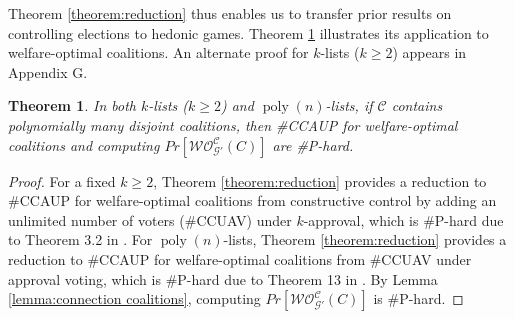 \documentclass[letterpaper]{article} %
\newtheorem{theorem}{Theorem}
\DeclareMathOperator*{\poly}{poly}
\begin{document}
Theorem \ref{theorem:reduction} thus enables us to transfer prior results on controlling elections to hedonic games. Theorem \ref{theorem:CCAUP-computationally-hard} illustrates its application to welfare-optimal coalitions. An alternate proof for $k$-lists ($k \geq 2$) appears in Appendix G. %
\begin{theorem}
\label{theorem:CCAUP-computationally-hard}
In both $k$-lists ($k \geq 2$) and $\poly(n)$-lists, if $\mathcal{C}$ contains polynomially many \textit{disjoint} coalitions, then \#CCAUP for welfare-optimal coalitions and computing $Pr[\mathcal{WO}^{\mathcal{C}}_{\mathcal{G}'}(C)]$ are \#P-hard. %
\end{theorem}
\begin{proof}
%
For a fixed $k \geq 2$, Theorem \ref{theorem:reduction} provides a reduction to \#CCAUP for welfare-optimal coalitions from constructive control by adding an unlimited number of voters (\#CCUAV) under $k$-approval, which is \#P-hard due to Theorem 3.2 in \cite{imber2021probabilistic}. For $\poly(n)$-lists, Theorem \ref{theorem:reduction} provides a reduction to \#CCAUP for welfare-optimal coalitions from \#CCUAV under approval voting, which is \#P-hard due to Theorem 13 in \cite{wojtas2012possible}. %
By Lemma \ref{lemma:connection coalitions}, computing $Pr[\mathcal{WO}^{\mathcal{C}}_{\mathcal{G}'}(C)]$ is \#P-hard.
\end{proof}
\end{document}

